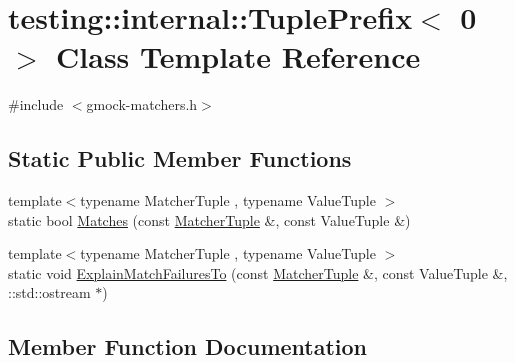\hypertarget{classtesting_1_1internal_1_1_tuple_prefix_3_010_01_4}{}\section{testing\+:\+:internal\+:\+:Tuple\+Prefix$<$ 0 $>$ Class Template Reference}
\label{classtesting_1_1internal_1_1_tuple_prefix_3_010_01_4}


{\ttfamily \#include $<$gmock-\/matchers.\+h$>$}

\subsection*{Static Public Member Functions}
\begin{DoxyCompactItemize}
\item 
{\footnotesize template$<$typename Matcher\+Tuple , typename Value\+Tuple $>$ }\\static bool \hyperlink{classtesting_1_1internal_1_1_tuple_prefix_3_010_01_4_a8bb323da9f209f4fef5d81d7c0b628e9}{Matches} (const \hyperlink{structtesting_1_1internal_1_1_matcher_tuple}{Matcher\+Tuple} \&, const Value\+Tuple \&)
\item 
{\footnotesize template$<$typename Matcher\+Tuple , typename Value\+Tuple $>$ }\\static void \hyperlink{classtesting_1_1internal_1_1_tuple_prefix_3_010_01_4_aa2980f100d8100e56a0dff1d6df9da57}{Explain\+Match\+Failures\+To} (const \hyperlink{structtesting_1_1internal_1_1_matcher_tuple}{Matcher\+Tuple} \&, const Value\+Tuple \&, \+::std\+::ostream $\ast$)
\end{DoxyCompactItemize}


\subsection{Member Function Documentation}
\mbox{\label{classtesting_1_1internal_1_1_tuple_prefix_3_010_01_4_aa2980f100d8100e56a0dff1d6df9da57}} 
